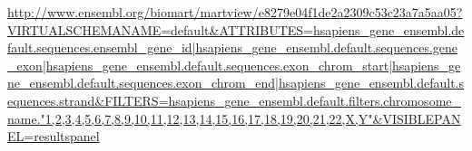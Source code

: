 \documentclass[10pt,letterpaper]{article}
\begin{document}
\begin{thebibliography}{10}
\url{http://www.ensembl.org/biomart/martview/e8279e04f1de2a2309c53c23a7a5aa05?VIRTUALSCHEMANAME=default&ATTRIBUTES=hsapiens_gene_ensembl.default.sequences.ensembl_gene_id|hsapiens_gene_ensembl.default.sequences.gene_exon|hsapiens_gene_ensembl.default.sequences.exon_chrom_start|hsapiens_gene_ensembl.default.sequences.exon_chrom_end|hsapiens_gene_ensembl.default.sequences.strand&FILTERS=hsapiens_gene_ensembl.default.filters.chromosome_name."1,2,3,4,5,6,7,8,9,10,11,12,13,14,15,16,17,18,19,20,21,22,X,Y"&VISIBLEPANEL=resultspanel}

\end{thebibliography}
\end{document}
